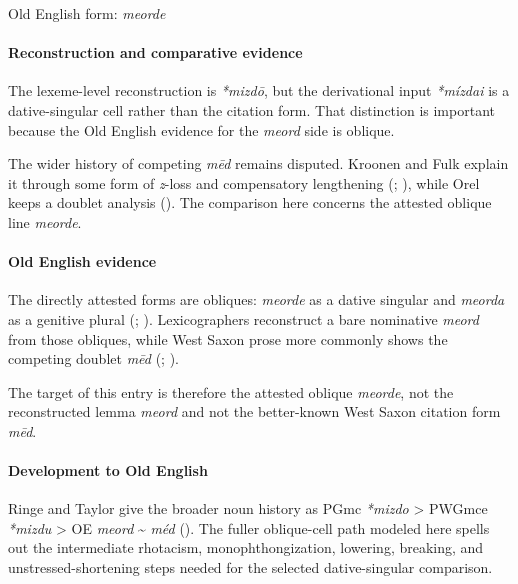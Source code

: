 \documentclass[
  british,
  a4paper,
]{article}
\begin{document}
Old English form: \emph{meorde}

\paragraph{Reconstruction and comparative
evidence}\label{reconstruction-and-comparative-evidence-50}

The lexeme-level reconstruction is \emph{*mizdō}, but the derivational
input \emph{*mízdai} is a dative-singular cell rather than the citation
form. That distinction is important because the Old English evidence for
the \emph{meord} side is oblique.

The wider history of competing \emph{mēd} remains disputed. Kroonen and
Fulk explain it through some form of \emph{z}-loss and compensatory
lengthening (;
), while Orel keeps a doublet
analysis (). The comparison here
concerns the attested oblique line \emph{meorde}.

\paragraph{Old English evidence}\label{old-english-evidence-50}

The directly attested forms are obliques: \emph{meorde} as a dative
singular and \emph{meorda} as a genitive plural
(;
).
Lexicographers reconstruct a bare nominative \emph{meord} from those
obliques, while West Saxon prose more commonly shows the competing
doublet \emph{mēd} (;
).

The target of this entry is therefore the attested oblique
\emph{meorde}, not the reconstructed lemma \emph{meord} and not the
better-known West Saxon citation form \emph{mēd}.

\paragraph{Development to Old
English}\label{development-to-old-english-50}

Ringe and Taylor give the broader noun history as PGmc \emph{*mizdo}
\textgreater{} PWGmce \emph{*mizdu} \textgreater{} OE \emph{meord}
\textasciitilde{} \emph{méd} (). The fuller oblique-cell path modeled here spells out
the intermediate rhotacism, monophthongization, lowering, breaking, and
unstressed-shortening steps needed for the selected dative-singular
comparison.
\end{document}
